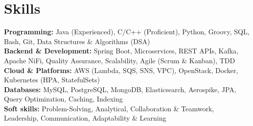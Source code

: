\section{\Large Skills}
\vspace{4pt}
\textbf{Programming:} Java (Experienced), C/C++ (Proficient), Python, Groovy, SQL, Bash, Git, Data Structures \& Algorithms (DSA) \\
\vspace{2pt}
\textbf{Backend \& Development:} Spring Boot, Microservices, REST APIs, Kafka, Apache NiFi, Quality Assurance, Scalability, Agile (Scrum \& Kanban), TDD \\
\vspace{2pt}
\textbf{Cloud \& Platforms:} AWS (Lambda, SQS, SNS, VPC), OpenStack, Docker, Kubernetes (HPA, StatefulSets) \\
\vspace{2pt}
\textbf{Databases:} MySQL, PostgreSQL, MongoDB, Elasticsearch, Aerospike, JPA, Query Optimization, Caching, Indexing \\
\vspace{2pt}
\textbf{Soft skills:} Problem-Solving, Analytical, Collaboration \& Teamwork, Leadership, Communication, Adaptability \& Learning
